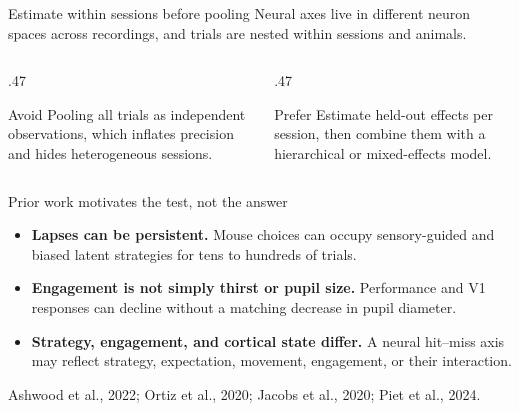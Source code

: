 \documentclass[aspectratio=169,10pt]{beamer}
\newcommand{\sourceNote}[1]{%
  \par\vfill{\fontsize{6}{7}\selectfont\color{NMAMidGray}#1}%
}
\begin{document}
\begin{frame}{Estimate within sessions before pooling}
  Neural axes live in different neuron spaces across recordings, and trials are
  nested within sessions and animals.

  \vspace{.8em}
  \begin{columns}[T,onlytextwidth]
    \begin{column}{.47\textwidth}
      \begin{alertblock}{Avoid}
        Pooling all trials as independent observations, which inflates precision
        and hides heterogeneous sessions.
      \end{alertblock}
    \end{column}
    \begin{column}{.47\textwidth}
      \begin{block}{Prefer}
        Estimate held-out effects per session, then combine them with a
        hierarchical or mixed-effects model.
      \end{block}
    \end{column}
  \end{columns}

\end{frame}

\begin{frame}{Prior work motivates the test, not the answer}
  \begin{itemize}
    \item \textbf{Lapses can be persistent.} Mouse choices can occupy sensory-guided
      and biased latent strategies for tens to hundreds of trials.
    \item \textbf{Engagement is not simply thirst or pupil size.} Performance and
      V1 responses can decline without a matching decrease in pupil diameter.
    \item \textbf{Strategy, engagement, and cortical state differ.} A neural
      hit--miss axis may reflect strategy, expectation, movement, engagement, or
      their interaction.
  \end{itemize}


  \sourceNote{Ashwood et al., 2022; Ortiz et al., 2020; Jacobs et al., 2020; Piet et al., 2024.}
\end{frame}
\end{document}

